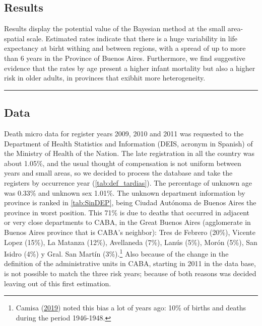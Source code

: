 \documentclass[12pt,]{article}
\begin{document}
\hypertarget{results}{%
\subsection{\texorpdfstring{\textbf{Results}}{Results}}\label{results}}

Results display the potential value of the Bayesian method at the small
area-spatial scale. Estimated rates indicate that there is a huge
variability in life expectancy at birht withing and between regions,
with a spread of up to more than 6 years in the Province of Buenos
Aires. Furthermore, we find suggestive evidence that the rates by age
present a higher infant mortality but also a higher risk in older
adults, in provinces that exibhit more heterogeneity.

\begin{center}\rule{0.5\linewidth}{0.5pt}\end{center}

\hypertarget{data}{%
\subsection{\texorpdfstring{\textbf{Data}}{Data}}\label{data}}

Death micro data for register years 2009, 2010 and 2011 was requested to
the Department of Health Statistics and Information (DEIS, acronym in
Spanish) of the Ministry of Health of the Nation. The late registration
in all the country was about 1.05\%, and the usual thought of
compensation is not uniform between years and small areas, so we decided
to process the database and take the registers by occurrence year
(\ref{tab:def_tardias}). The percentage of unknown age was 0.33\% and
unknown sex 1.01\%. The unknown department information by province is
ranked in \ref{tab:SinDEP}, being Ciudad Autónoma de Buenos Aires the
province in worst position. This 71\% is due to deaths that occurred in
adjacent or very close departments to CABA, in the Great Buenos Aires
(agglomerate in Buenos Aires province that is CABA's neighbor): Tres de
Febrero (20\%), Vicente Lopez (15\%), La Matanza (12\%), Avellaneda
(7\%), Lanús (5\%), Morón (5\%), San Isidro (4\%) y Gral. San Martín
(3\%).\footnote{Camisa (\protect\hyperlink{ref-Camisa_2019}{2019}) noted
  this bias a lot of years ago: 10\% of births and deaths during the
  period 1946-1948.} Also because of the change in the definition of the
administrative units in CABA, starting in 2011 in the data base, is not
possible to match the three risk years; because of both reasons was
decided leaving out of this first estimation.
\end{document}
